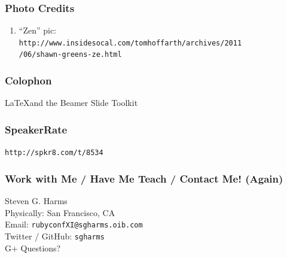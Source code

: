 \documentclass[slidestop,compress,mathserif]{beamer}
\begin{document}
\begin{frame}
	\frametitle{Photo Credits}
	\begin{enumerate}
		\footnotesize
		\item ``Zen'' pic:\\ \texttt{http://www.insidesocal.com/tomhoffarth/archives/2011\\
		 /06/shawn-greens-ze.html}
		\normalsize
	\end{enumerate}
\end{frame}

\begin{frame}
	\frametitle{Colophon}
	\LaTeX and the Beamer Slide Toolkit
\end{frame}

\begin{frame}
	\frametitle{SpeakerRate}
	\vskip 1.25cm
	\begin{center}
		\texttt{http://spkr8.com/t/8534}
	\end{center}
\end{frame}

\begin{frame}
	\frametitle{Work with Me / Have Me Teach / Contact Me! (Again)}
	\begin{center}
		Steven G. Harms \\
		\vskip 1.25cm
		Physically:  San Francisco, CA\\
		Email:  \texttt{rubyconfXI@sgharms.oib.com} \\
		Twitter / GitHub:  \texttt{sgharms} \\
		G+
		\vskip 1.0cm
		Questions?
	\end{center}
\end{frame}
\end{document}

